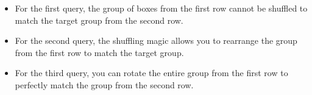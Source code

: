 \begin{itemize}
    \item For the first query, the group of boxes from the first row cannot be shuffled to match the target group from the second row.
    \item For the second query, the shuffling magic allows you to rearrange the group from the first row to match the target group.
    \item For the third query, you can rotate the entire group from the first row to perfectly match the group from the second row.
\end{itemize}